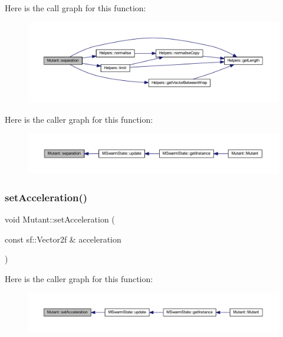 Here is the call graph for this function\+:
\nopagebreak
\begin{figure}[H]
\begin{center}
\leavevmode
\includegraphics[width=350pt]{class_mutant_a0ea8c6678568932e57054f13c00d12d9_cgraph}
\end{center}
\end{figure}
Here is the caller graph for this function\+:
\nopagebreak
\begin{figure}[H]
\begin{center}
\leavevmode
\includegraphics[width=350pt]{class_mutant_a0ea8c6678568932e57054f13c00d12d9_icgraph}
\end{center}
\end{figure}
\mbox{\label{class_mutant_a307fa4d660b49702927e18d2dc316376}} 
\subsubsection{\texorpdfstring{set\+Acceleration()}{setAcceleration()}}
{\footnotesize\ttfamily void Mutant\+::set\+Acceleration (\begin{DoxyParamCaption}\item[{const sf\+::\+Vector2f \&}]{acceleration }\end{DoxyParamCaption})}

Here is the caller graph for this function\+:
\nopagebreak
\begin{figure}[H]
\begin{center}
\leavevmode
\includegraphics[width=350pt]{class_mutant_a307fa4d660b49702927e18d2dc316376_icgraph}
\end{center}
\end{figure}
\mbox{\label{class_mutant_ac404012989fab1737c145a09f37c69c3}} 

